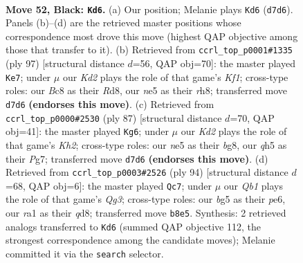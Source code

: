 \documentclass[11pt]{article}
\begin{document}
\clearpage

\begin{figure}[p]\centering
\begin{subfigure}{0.46\textwidth}\centering
\resizebox{\linewidth}{!}{%
\newchessgame
\chessboard[
  setfen={1qb5/r2k4/4p3/p2pNpBQ/P6P/8/2R5/RN4K1 b - - 0 52},
  showmover=false,
  pgfstyle=straightmove, color=movearrow, markmove={d7-d6}
]}
\caption{}
\end{subfigure}\hfill
\begin{subfigure}{0.46\textwidth}\centering
\resizebox{\linewidth}{!}{%
\newchessgame
\chessboard[
  setfen={3r1k1R/2p2pp1/p3bNR1/4q3/1pP5/8/6K1/1BQ5 b - - 1 49},
  showmover=false,
  pgfstyle=straightmove, color=movearrow, markmove={f8-e7}
]}
\caption{}
\end{subfigure}
\\[4pt]
\begin{subfigure}{0.46\textwidth}\centering
\resizebox{\linewidth}{!}{%
\newchessgame
\chessboard[
  setfen={5RB1/6pk/3p3r/4pb2/1P6/2P1Q1P1/6K1/3q4 b - - 16 44},
  showmover=false,
  pgfstyle=straightmove, color=movearrow, markmove={h7-g6}
]}
\caption{}
\end{subfigure}\hfill
\begin{subfigure}{0.46\textwidth}\centering
\resizebox{\linewidth}{!}{%
\newchessgame
\chessboard[
  setfen={1r1q2kb/5p2/4p2P/6p1/2R3P1/PB4Q1/KP6/8 w - - 13 48},
  showmover=false,
  pgfstyle=straightmove, color=movearrow, markmove={g3-c7}
]}
\caption{}
\end{subfigure}
\caption{\textbf{Move 52, Black: \texttt{Kd6}.} (a) Our position; Melanie plays \texttt{Kd6} (\texttt{d7d6}). Panels (b)--(d) are the retrieved master positions whose correspondence most drove this move (highest QAP objective among those that transfer to it). (b) Retrieved from \texttt{ccrl\_top\_p0001\#1335} (ply 97) [structural distance $d$=56, QAP obj=70]: the master played \texttt{Ke7}; under $\mu$ our \emph{Kd2} plays the role of that game's \emph{Kf1}; cross-type roles: our \emph{B}c8 as their \emph{R}d8, our \emph{n}e5 as their \emph{r}h8; transferred move \texttt{d7d6} \textbf{(endorses this move)}. (c) Retrieved from \texttt{ccrl\_top\_p0000\#2530} (ply 87) [structural distance $d$=70, QAP obj=41]: the master played \texttt{Kg6}; under $\mu$ our \emph{Kd2} plays the role of that game's \emph{Kh2}; cross-type roles: our \emph{n}e5 as their \emph{b}g8, our \emph{q}h5 as their \emph{P}g7; transferred move \texttt{d7d6} \textbf{(endorses this move)}. (d) Retrieved from \texttt{ccrl\_top\_p0003\#2526} (ply 94) [structural distance $d$=68, QAP obj=6]: the master played \texttt{Qc7}; under $\mu$ our \emph{Qb1} plays the role of that game's \emph{Qg3}; cross-type roles: our \emph{b}g5 as their \emph{p}e6, our \emph{r}a1 as their \emph{q}d8; transferred move \texttt{b8e5}. Synthesis: 2 retrieved analogs transferred to \texttt{Kd6} (summed QAP objective 112, the strongest correspondence among the candidate moves); Melanie committed it via the \texttt{search} selector.}
\label{fig:thought-m103}
\end{figure}
\end{document}
